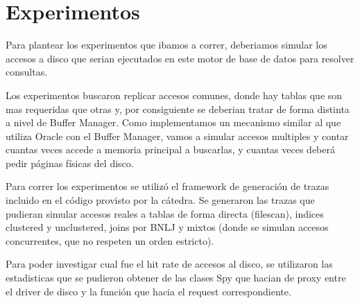 \section{Experimentos}


Para plantear los experimentos que ibamos a correr, deberiamos simular los accesos a disco que serian ejecutados
en este motor de base de datos para resolver consultas.

Los experimentos buscaron replicar accesos comunes, donde hay tablas que son mas requeridas que otras y, por
consiguiente se deberian tratar de forma distinta a nivel de Buffer Manager. Como implementamos un mecanismo
similar al que utiliza Oracle con el Buffer Manager, vamos a simular accesos multiples y contar cuantas veces
accede a memoria principal a buscarlas, y cuantas veces deber\'a pedir p\'aginas f\'isicas del disco.

Para correr los experimentos se utiliz\'o el framework de generaci\'on de trazas incluido en el c\'odigo provisto
por la c\'atedra. Se generaron las trazas que pudieran simular accesos reales a tablas de forma directa (filescan),
indices clustered y unclustered, joins por BNLJ y mixtos (donde se simulan accesos concurrentes, que no respeten
un orden estricto).

Para poder investigar cual fue el hit rate de accesos al disco, se utilizaron las estadisticas que se pudieron
obtener de las clases Spy que hacian de proxy entre el driver de disco y la funci\'on que hacia el request
correspondiente. 
